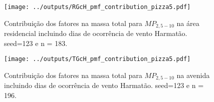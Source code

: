 
\begin{landscape}
  \begin{figure}
    \centering
    \begin{minipage}[b]{0.45\linewidth}
      \texttt{[image: ../outputs/RGcH\_pmf\_contribution\_pizza5.pdf]}
      \caption{Contribuição dos fatores na massa total para $MP_{2,5-10}$ na área
               residencial incluindo dias de ocorrência de vento Harmatão. seed=123 e n = 183.
               \label{table:RGcH_contribution5}}
    \end{minipage}%
    \hspace{0.5cm}
    \begin{minipage}[b]{0.45\linewidth}
      
    \end{minipage}
  \end{figure}
\end{landscape}

\begin{landscape}
  \begin{figure}
    \centering
    \begin{minipage}[b]{0.45\linewidth}
      \texttt{[image: ../outputs/TGcH\_pmf\_contribution\_pizza5.pdf]}
      \caption{Contribuição dos fatores na massa total para $MP_{2,5-10}$ na avenida
               incluindo dias de ocorrência de vento Harmatão. seed=123 e n = 196.
               \label{table:TGcH_contribution5}}
    \end{minipage}%
    \hspace{0.5cm}
    \begin{minipage}[b]{0.45\linewidth}
      
    \end{minipage}
  \end{figure}
\end{landscape}


